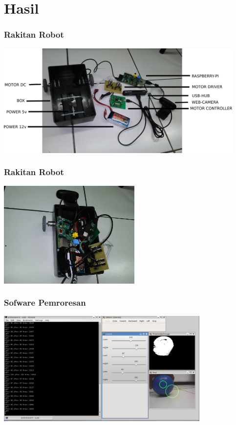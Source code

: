 \documentclass[table,dvipsnames]{beamer}
\begin{document}
\section{Hasil}

\begin{frame}
\frametitle{Rakitan Robot}
\begin{center}
 \includegraphics[width=350pt]{./rakitan/appart}
\end{center}
\end{frame}

\begin{frame}
\frametitle{Rakitan Robot}
\begin{center}
 \includegraphics[width=200pt]{./rakitan/full}
\end{center}
\end{frame}

\begin{frame}
\frametitle{Sofware Pemroresan}
\begin{center}
 \includegraphics[width=300pt]{./soft_pic/softpic}
\end{center}
\end{frame}
\end{document}
